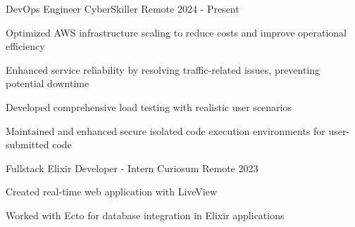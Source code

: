 

\begin{cventries}

  \cventry
    {DevOps Engineer} %
    {CyberSkiller} %
    {Remote} %
    {2024 - Present} %
    {
      \begin{cvitems} %
        \item {Optimized AWS infrastructure scaling to reduce costs and improve operational efficiency}
        \item {Enhanced service reliability by resolving traffic-related issues, preventing potential downtime}
        \item {Developed comprehensive load testing with realistic user scenarios}
        \item {Maintained and enhanced secure isolated code execution environments for user-submitted code}
      \end{cvitems}
    }
    \vspace{3mm}

  \cventry
    {Fullstack Elixir Developer - Intern} %
    {Curiosum} %
    {Remote} %
    {2023} %
    {
      \begin{cvitems} %
        \item {Created real-time web application with LiveView}
        \item {Worked with Ecto for database integration in Elixir applications}
      \end{cvitems}
    }

\end{cventries}
